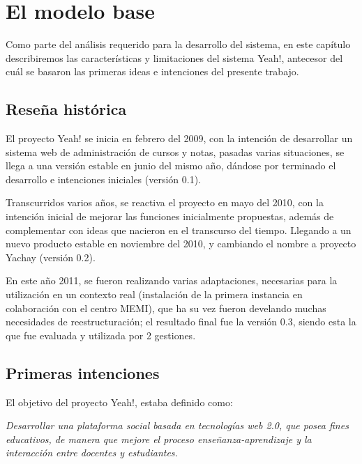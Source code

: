 \chapter{El modelo base}

Como parte del análisis requerido para la desarrollo del sistema, en este capítulo describiremos las características y limitaciones del sistema Yeah!, antecesor del cuál se basaron las primeras ideas e intenciones del presente trabajo.

\section{Reseña histórica}
El proyecto Yeah! se inicia en febrero del 2009, con la intención de desarrollar un sistema web de administración de cursos y notas, pasadas varias situaciones, se llega a una versión estable en junio del mismo año, dándose por terminado el desarrollo e intenciones iniciales (versión 0.1).

Transcurridos varios años, se reactiva el proyecto en mayo del 2010, con la intención inicial de mejorar las funciones inicialmente propuestas, además de complementar con ideas que nacieron en el transcurso del tiempo. Llegando a un nuevo producto estable en noviembre del 2010, y cambiando el nombre a proyecto Yachay  (versión 0.2).

En este año 2011, se fueron realizando varias adaptaciones, necesarias para la utilización en un contexto real (instalación de la primera instancia en colaboración con el centro MEMI), que ha su vez fueron develando muchas necesidades de reestructuración; el resultado final fue la versión 0.3, siendo esta la que fue evaluada y utilizada por 2 gestiones.

\section{Primeras intenciones}
El objetivo del proyecto Yeah!, estaba definido como:

\emph{Desarrollar una plataforma social basada en tecnologías web 2.0, que posea fines educativos, de manera que mejore el proceso enseñanza-aprendizaje y la interacción entre docentes y estudiantes.}

